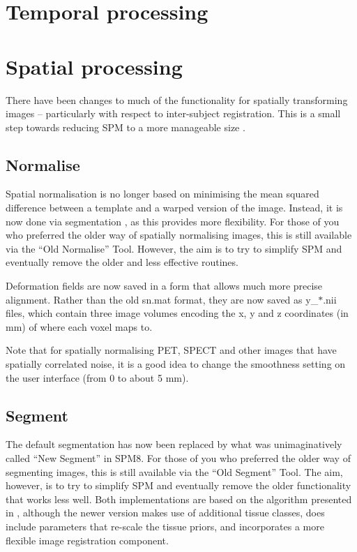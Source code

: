 \documentclass[a4paper,titlepage,openany]{article}
\begin{document}

\vspace{10mm}
\begin{multicols}{2}

\section{Temporal processing}

\section{Spatial processing}
There have been changes to much of the functionality for spatially transforming images -- particularly with respect to inter-subject registration.
This is a small step towards reducing SPM to a more manageable size \cite{ashburner2011spm}.

\subsection{Normalise}
Spatial normalisation is no longer based on minimising the mean squared difference between a template and a warped version of the image.
Instead, it is now done via segmentation \cite{ashburner05}, as this provides more flexibility.
For those of you who preferred the older way of spatially normalising images, this is still available via the ``Old Normalise'' Tool.
However, the aim is to try to simplify SPM and eventually remove the older and less effective \cite{klein_evaluation} routines.

Deformation fields are now saved in a form that allows much more precise alignment.
Rather than the old sn.mat format, they are now saved as y\_$*$.nii files, which contain three image volumes encoding the x, y and z coordinates (in mm) of where each voxel maps to.

Note that for spatially normalising PET, SPECT and other images that have spatially correlated noise, it is a good idea to change the smoothness setting on the user interface (from 0 to about 5 mm).

\subsection{Segment}
The default segmentation has now been replaced by what was unimaginatively called ``New Segment'' in SPM8.
For those of you who preferred the older way of segmenting images, this is still available via the ``Old Segment'' Tool.
The aim, however, is to try to simplify SPM and eventually remove the older functionality that works less well.
Both implementations are based on the algorithm presented in \cite{ashburner05}, although the newer version makes use of additional tissue classes, does include parameters that re-scale the tissue priors, and incorporates a more flexible image registration component.


\end{multicols}
\end{document}
